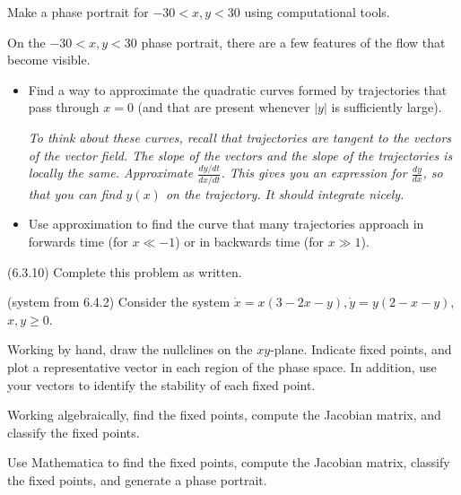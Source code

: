\documentclass[12pt,letterpaper,noanswers]{exam}
\begin{document}
\begin{questions}
\begin{parts}
\item Make a phase portrait for $-30<x,y<30$ using computational tools.

\item On the $-30<x,y<30$ phase portrait, there are a few features of the flow that become visible.  
\begin{itemize}
    \item Find a way to approximate the quadratic curves formed by trajectories that pass through $x=0$ (and that are present whenever $\vert y\vert$ is sufficiently large).
    
    \emph{To think about these curves, recall that trajectories are tangent to the vectors of the vector field.  The slope of the vectors and the slope of the trajectories is locally the same. Approximate $\displaystyle\frac{dy/dt}{dx/dt}$.  This gives you an expression for $\displaystyle\frac{dy}{dx}$, so that you can find $y(x)$ on the trajectory. It should integrate nicely.}

    \item Use approximation to find the curve that many trajectories approach in forwards time (for $x\ll -1$) or in backwards time (for $x\gg 1$). 
\end{itemize}
\end{parts}

\item (6.3.10) Complete this problem as written.  

\item (system from 6.4.2) Consider the system $\dot x = x(3-2x-y), \dot y = y(2-x-y)$, $x,y\geq 0$.
\begin{parts}
\item Working by hand, draw the nullclines on the $xy$-plane.  Indicate fixed points, and plot a representative vector in each region of the phase space.  In addition, use your vectors to identify the stability of each fixed point.
\item Working algebraically, find the fixed points, compute the Jacobian matrix, and classify the fixed points.
\item Use Mathematica to find the fixed points, compute the Jacobian matrix, classify the fixed points, and generate a phase portrait.
\end{parts}

\end{questions}
\end{document}
